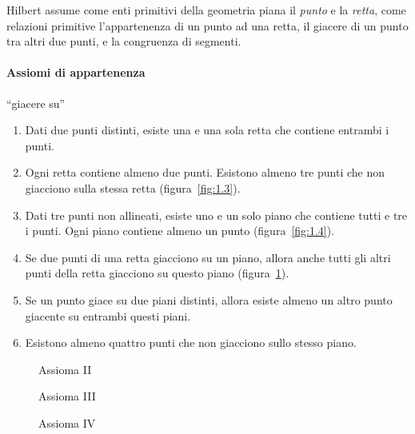 Hilbert assume come enti primitivi della geometria piana il 
\emph{punto} e la \emph{retta}, come relazioni primitive 
l'appartenenza di un punto ad una retta, il giacere di un punto tra 
altri due punti, e la congruenza di segmenti.

\paragraph{Assiomi di appartenenza} ``giacere su''
\begin{enumerate}[label=\Roman{*}.]
\item Dati due punti distinti, esiste una e una sola retta che 
contiene entrambi i punti.
\item Ogni retta contiene almeno due punti. Esistono almeno tre punti 
che non giacciono sulla stessa retta (figura~\ref{fig:1.3}).
\item Dati tre punti non allineati, esiste uno e un solo piano che 
contiene tutti e tre i punti. Ogni piano contiene almeno un punto 
(figura~\ref{fig:1.4}).
\item Se due punti di una retta giacciono su un piano, allora anche 
tutti gli altri punti della retta giacciono su questo piano 
(figura~\ref{fig:1.5}).
\item Se un punto giace su due piani distinti, allora esiste almeno 
un altro punto giacente su entrambi questi piani.
\item Esistono almeno quattro punti che non giacciono sullo stesso 
piano.
\end{enumerate}


\begin{inaccessibleblock}
 \begin{figure}[bth]
 \begin{minipage}[b]{.32\textwidth}
 \centering
 
 \caption{Assioma II}\label{fig:1.3}
 \end{minipage}
 \begin{minipage}[b]{.32\textwidth}
 \centering
 
 \caption{Assioma III}\label{fig:1.4}
 \end{minipage}
 \begin{minipage}[b]{.32\textwidth}
 \centering
 
 \caption{Assioma IV}\label{fig:1.5}
 \end{minipage}
\end{figure}
\end{inaccessibleblock}

